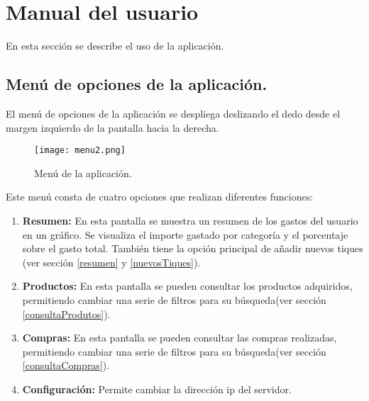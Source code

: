 \cleardoublepage
\section{Manual del usuario}

En esta sección se describe el uso de la aplicación.

\subsection{Menú de opciones de la aplicación. \label{menu}}

El menú de opciones de la aplicación se despliega deslizando el dedo desde el margen izquierdo de la pantalla hacia la derecha.

\begin{figure}[ht]
\begin{center}
  \texttt{[image: menu2.png]}
  \caption{Menú de la aplicación.}\label{fig:menu}
\endminipage 
\end{center}
\end{figure}


Este menú consta de cuatro opciones que realizan diferentes funciones:
\begin{enumerate}
	\item \textbf{Resumen: }En esta pantalla se muestra un resumen de los gastos del usuario en un gráfico. Se visualiza el importe gastado por categoría y el porcentaje sobre el gasto total. También tiene la opción principal de añadir nuevos tiques (ver sección \ref{resumen} y \ref{nuevosTiques}).
	\item \textbf{Productos: }En esta pantalla se pueden consultar los productos adquiridos, permitiendo cambiar una serie de filtros para su búsqueda(ver sección \ref{consultaProdutos}).
	\item \textbf{Compras: }En esta pantalla se pueden consultar las compras realizadas, permitiendo cambiar una serie de filtros para su búsqueda(ver sección \ref{consultaCompras}).
	\item \textbf{Configuración: } Permite cambiar la dirección ip del servidor. 
\end{enumerate}



